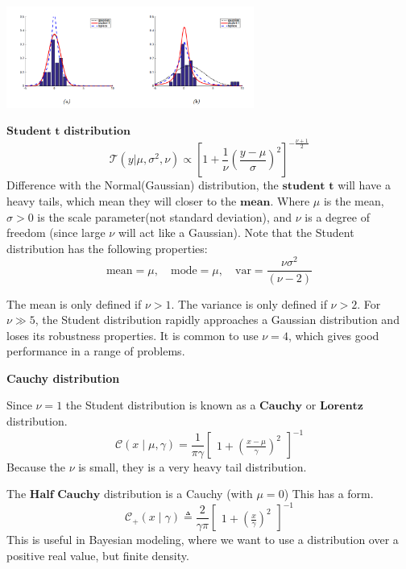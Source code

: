 \documentclass[10pt,landscape]{article}
\begin{document}
\begin{multicols*}{3}
\begin{minipage}{\linewidth}
    \centering
    \includegraphics[width=3.2in]{figures/common-uni-distribution.PNG}
\end{minipage}
$\textbf{Student t distribution}$
\[
\mathcal{T}(y | \mu, \sigma^2, \nu) \propto 
\left[ 1 + \frac{1}{\nu} \left( \frac{y - \mu}{\sigma} \right)^2 \right]^{-\frac{\nu + 1}{2}}
\]
Difference with the Normal(Gaussian) distribution, the $\textbf{student t}$ will have a heavy tails, which mean they will closer to the $\textbf{mean}$. Where $\mu$ is the mean, $\sigma > 0$ is the scale parameter(not standard deviation), and $\nu$ is a degree of freedom (since large $\nu$ will act like a Gaussian). Note that the Student distribution has the following properties:
\[
\text{mean} = \mu, \quad \text{mode} = \mu, \quad \text{var} = \frac{\nu \sigma^2}{(\nu - 2)}
\]

The mean is only defined if $\nu > 1$. The variance is only defined if $\nu > 2$. For $\nu \gg 5$, the Student distribution rapidly approaches a Gaussian distribution and loses its robustness properties. It is common to use $\nu = 4$, which gives good performance in a range of problems.

\textbf{Cauchy distribution}

Since $\nu=1$ the Student distribution is known as a $\textbf{Cauchy}$ or $\textbf{Lorentz}$ distribution.
\[
    \mathcal{C}(x\mid\mu,\gamma)=\frac{1}{\pi\gamma}
    \begin{bmatrix}
        1+\left(\frac{x-\mu}{\gamma}\right)^2
    \end{bmatrix}^{-1}
\]
Because the $\nu$ is small, they is a very heavy tail distribution.

The $\textbf{Half Cauchy}$ distribution is a Cauchy (with $\mu=0$) This has a form. 
\[
    \mathcal{C}_+(x\mid \gamma) \triangleq \frac{2}{\gamma\pi}
    \begin{bmatrix}
        1+\left(\frac{x}{\gamma}\right)^2
    \end{bmatrix}^{-1}
\]
This is useful in Bayesian modeling, where we want to use a distribution over a positive real value, but finite density.
\vspace{8\baselineskip}


\end{multicols*}
\end{document}
